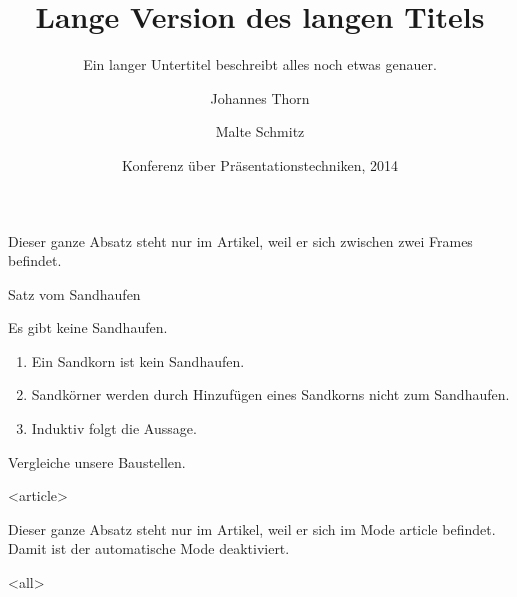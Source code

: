 \title[Kurztitel]{%
  Lange Version des langen Titels}

\subtitle{Ein langer Untertitel beschreibt
  alles noch etwas genauer.}

\author[Thorn, Schmitz]{%
  Johannes Thorn \and Malte Schmitz}

\date[KPT 2014]{Konferenz über
  Präsentationstechniken, 2014}


  \mode*

  \begin{frame}
    \maketitle
  \end{frame}

  Dieser ganze Absatz steht nur im Artikel,
  weil er sich zwischen zwei Frames befindet.

  \begin{frame}{Satz vom Sandhaufen}
    \begin{Satz}[Sandhaufensatz]
      Es gibt keine Sandhaufen.
    \end{Satz}

    \begin{Beweis}
      \begin{enumerate}
        \item Ein Sandkorn ist kein Sandhaufen.
        \item Sandkörner werden durch Hinzufügen
          eines Sandkorns nicht zum Sandhaufen.
        \item Induktiv folgt die Aussage. \qedhere
      \end{enumerate}
    \end{Beweis}

    \begin{Beispiel}
      Vergleiche unsere Baustellen.

    \end{Beispiel}
  \end{frame}

  \mode
  <article>

  Dieser ganze Absatz steht nur im Artikel,
  weil er sich im Mode article befindet.
  Damit ist der automatische Mode deaktiviert.

  \mode
  <all>
